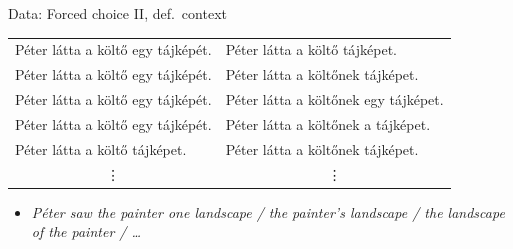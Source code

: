 \documentclass[12pt]{beamer}
\begin{document}
\begin{frame}{Data: Forced choice II, def.\ context}


{\small
\hspace{-.5cm}\begin{tabulary}{1\linewidth}{ll}
Péter látta a költő \alert{egy} tájképét. & Péter látta a költő tájképet.\\
Péter látta a költő \alert{egy} tájképét. & Péter látta a költő\textcolor{red!70!black}{nek} tájképet.\\
Péter látta a költő \alert{egy} tájképét. & Péter látta a költő\textcolor{red!70!black}{nek} \alert{egy} tájképet.\\
Péter látta a költő \alert{egy} tájképét. & Péter látta a költő\textcolor{red!70!black}{nek} \textcolor{green!70!black}{a} tájképet.\\
Péter látta a költő tájképet.     & Péter látta a költő\textcolor{red!70!black}{nek} tájképet.\\
 & \\
\end{tabulary}
}

\begin{itemize}
    \item \emph{Péter saw the painter \alert{one} landscape / the painter's landscape / \textcolor{green!70!black}{the} landscape \textcolor{red!70!black}{of the} painter / \dots}
\end{itemize}

\end{frame}
\end{document}
